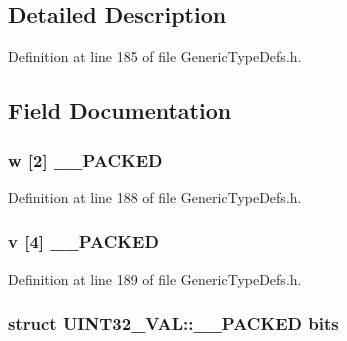 \subsection{Detailed Description}


Definition at line 185 of file Generic\+Type\+Defs.\+h.



\subsection{Field Documentation}
\hypertarget{union_u_i_n_t32___v_a_l_a9f9202d9cccd6e4a1faa633683d49ac6}{}
\subsubsection[{\+\_\+\+\_\+\+P\+A\+C\+K\+E\+D}]{ w \mbox{[}2\mbox{]} {\bf \+\_\+\+\_\+\+P\+A\+C\+K\+E\+D}}\label{union_u_i_n_t32___v_a_l_a9f9202d9cccd6e4a1faa633683d49ac6}


Definition at line 188 of file Generic\+Type\+Defs.\+h.

\hypertarget{union_u_i_n_t32___v_a_l_ae73a72872d1fc4d202ce80eacc280e8b}{}
\subsubsection[{\+\_\+\+\_\+\+P\+A\+C\+K\+E\+D}]{ {\bf v} \mbox{[}4\mbox{]} {\bf \+\_\+\+\_\+\+P\+A\+C\+K\+E\+D}}\label{union_u_i_n_t32___v_a_l_ae73a72872d1fc4d202ce80eacc280e8b}


Definition at line 189 of file Generic\+Type\+Defs.\+h.

\hypertarget{union_u_i_n_t32___v_a_l_a47eaf0c7ae358afaa10099eae3dffe0d}{}
\subsubsection[{bits}]{\setlength{\rightskip}{0pt plus 5cm}struct {\bf U\+I\+N\+T32\+\_\+\+V\+A\+L\+::\+\_\+\+\_\+\+P\+A\+C\+K\+E\+D}  bits}\label{union_u_i_n_t32___v_a_l_a47eaf0c7ae358afaa10099eae3dffe0d}
\hypertarget{union_u_i_n_t32___v_a_l_a0a29939c26754944b3f1e6c3f2eddd50}{}

